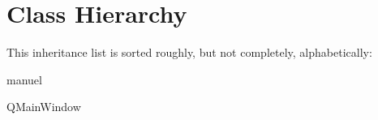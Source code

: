 \section{Class Hierarchy}
This inheritance list is sorted roughly, but not completely, alphabetically\+:\begin{DoxyCompactList}
\item manuel\begin{DoxyCompactList}
\item {}
\end{DoxyCompactList}
\item Q\+Main\+Window\begin{DoxyCompactList}
\item {}
\item {}
\end{DoxyCompactList}
\end{DoxyCompactList}
